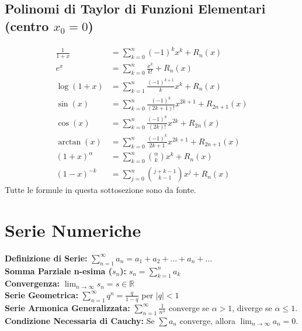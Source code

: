 \documentclass[12pt, a4paper]{article}
\begin{document}
\subsection{Polinomi di Taylor di Funzioni Elementari (centro $x_0=0$)}
\begin{align*}
\frac{1}{1+x} &= \sum_{k=0}^{n} (-1)^k x^k + R_n(x) \\
e^x &= \sum_{k=0}^{n} \frac{x^k}{k!} + R_n(x) \\
\log(1+x) &= \sum_{k=1}^{n} \frac{(-1)^{k+1}}{k} x^k + R_n(x) \\
\sin(x) &= \sum_{k=0}^{n} \frac{(-1)^k}{(2k+1)!} x^{2k+1} + R_{2n+1}(x) \\
\cos(x) &= \sum_{k=0}^{n} \frac{(-1)^k}{(2k)!} x^{2k} + R_{2n}(x) \\
\arctan(x) &= \sum_{k=0}^{n} \frac{(-1)^k}{2k+1} x^{2k+1} + R_{2n+1}(x) \\
(1+x)^{\alpha} &= \sum_{k=0}^{n} \binom{\alpha}{k} x^k + R_n(x) \\
(1-x)^{-k} &= \sum_{j=0}^{n}\binom{j+k-1}{k-1}x^{j}+R_{n}(x)
\end{align*}
Tutte le formule in questa sottosezione sono da fonte.

\section{Serie Numeriche}

\textbf{Definizione di Serie:} $\sum_{n=1}^{\infty} a_n = a_1 + a_2 + \dots + a_n + \dots$  \\
\textbf{Somma Parziale n-esima ($s_n$):} $s_n = \sum_{k=1}^{n} a_k$  \\
\textbf{Convergenza:} $\lim_{n \to \infty} s_n = s \in \mathbb{R}$  \\
\textbf{Serie Geometrica:} $\sum_{n=1}^{\infty} q^n = \frac{q}{1-q}$ per $|q|<1$  \\
\textbf{Serie Armonica Generalizzata:} $\sum_{n=1}^{\infty} \frac{1}{n^\alpha}$ converge se $\alpha > 1$, diverge se $\alpha \leq 1$.  \\
\textbf{Condizione Necessaria di Cauchy:} Se $\sum a_n$ converge, allora $\lim_{n \to \infty} a_n = 0$. 
\end{document}
